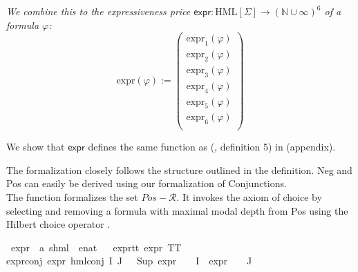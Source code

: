 \begin{isabellebody}
\begin{isamarkuptext}
\textit{We combine this to the expressiveness price $\textsf{expr}: \text{HML}[\Sigma] \rightarrow (\mathbb{N \cup \infty})^6$ of a formula $\varphi$:
\[
\text{expr}(\varphi) :=
\begin{pmatrix}
\text{expr}_1(\varphi) \\
\text{expr}_2(\varphi) \\
\text{expr}_3(\varphi) \\
\text{expr}_4(\varphi) \\
\text{expr}_5(\varphi) \\
\text{expr}_6(\varphi) \\
\end{pmatrix}
\]
}

We show that $\textsf{expr}$ defines the same function as (\cite{bisping2023process}, definition 5) in (appendix).%
\end{isamarkuptext}\isamarkuptrue%
%
\begin{isamarkuptext}%
The formalization closely follows the structure outlined in the definition. Neg and Pos can easily be derived using our formalization of Conjunctions. \\
The function  formalizes the set $Pos - \mathcal{R}$. It invokes the axiom of choice by selecting and removing a formula with maximal modal depth from Pos using the Hilbert choice operator .%
\end{isamarkuptext}\isamarkuptrue%
\isamarkupfalse%
\ expr{\isacharunderscore}{\kern0pt}{}\ {\isacharcolon}{\kern0pt}{\isacharcolon}{\kern0pt}\ {\isachardoublequoteopen}{\isacharparenleft}{\kern0pt}{\isacharprime}{\kern0pt}a{\isacharcomma}{\kern0pt}\ {\isacharprime}{\kern0pt}s{\isacharparenright}{\kern0pt}hml\ {\isasymRightarrow}\ enat{\isachardoublequoteclose}\isanewline
\ \ \isanewline
expr{\isacharunderscore}{\kern0pt}{}{\isacharunderscore}{\kern0pt}tt{\isacharcolon}{\kern0pt}\ {\isacartoucheopen}expr{\isacharunderscore}{\kern0pt}{}\ TT\ {\isacharequal}{\kern0pt}\ {}{\isacartoucheclose}\ {\isacharbar}{\kern0pt}\isanewline
expr{\isacharunderscore}{\kern0pt}{}{\isacharunderscore}{\kern0pt}conj{\isacharcolon}{\kern0pt}\ {\isacartoucheopen}expr{\isacharunderscore}{\kern0pt}{}\ {\isacharparenleft}{\kern0pt}hml{\isacharunderscore}{\kern0pt}conj\ I\ J\ {\isasymPhi}{\isacharparenright}{\kern0pt}\ {\isacharequal}{\kern0pt}\ Sup\ {\isacharparenleft}{\kern0pt}{\isacharparenleft}{\kern0pt}expr{\isacharunderscore}{\kern0pt}{}\ {\isasymcirc}\ {\isasymPhi}{\isacharparenright}{\kern0pt}\ {\isacharbackquote}{\kern0pt}\ I\ {\isasymunion}\ {\isacharparenleft}{\kern0pt}expr{\isacharunderscore}{\kern0pt}{}\ {\isasymcirc}\ {\isasymPhi}{\isacharparenright}{\kern0pt}\ {\isacharbackquote}{\kern0pt}\ J{\isacharparenright}{\kern0pt}{\isacartoucheclose}\ {\isacharbar}{\kern0pt}\isanewline

\end{isabellebody}
